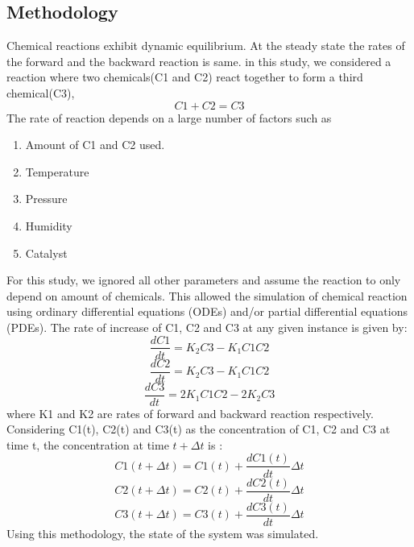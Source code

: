 \documentclass[10pt,journal,cspaper,compsoc]{IEEEtran}
\begin{document}
  \subsection{Methodology}
  Chemical reactions exhibit dynamic equilibrium. At the steady state the rates of the forward and the backward reaction is same.
  in this study, we considered a reaction where two chemicals(C1 and C2) react together to form a third chemical(C3),
  \begin{equation}
    C1 + C2 = C3
  \end{equation} 
  The rate of reaction depends on a large number of factors such as 
  \begin{enumerate}
    \item Amount of C1 and C2 used.
    \item Temperature
    \item Pressure
    \item Humidity
    \item Catalyst
  \end{enumerate}
  For this study, we ignored all other parameters and assume the reaction to only depend on amount of chemicals.
  This allowed the simulation of chemical reaction using ordinary differential equations (ODEs) and/or partial differential equations (PDEs).
  The rate of increase of C1, C2 and C3 at any given instance is given by:
  \begin{equation}
    \frac{dC1}{dt} = K_{2} C3 - K_{1} C1 C2 
  \end{equation}
\begin{equation}
  \frac{dC2}{dt} = K_{2} C3 - K_{1} C1 C2
\end{equation}
\begin{equation}
  \frac{dC3}{dt} = 2 K_{1} C1 C2 - 2 K_{2} C3
\end{equation}
where K1 and K2 are rates of forward and backward reaction respectively.\\
Considering C1(t), C2(t) and C3(t) as the concentration of C1, C2 and C3 at time t, the concentration at time 
\begin{math}
  t + \Delta t
\end{math}
is :
\begin{equation}
  C1(t+\Delta t) = C1(t) + \frac{dC1(t)}{dt} \Delta t
\end{equation} 
\begin{equation}
  C2(t+\Delta t) = C2(t) + \frac{dC2(t)}{dt} \Delta t
\end{equation}
\begin{equation}
  C3(t+\Delta t) = C3(t) + \frac{dC3(t)}{dt} \Delta t
\end{equation}
Using this methodology, the state of the system was simulated.
\cite{lab1}
\pagebreak  
\end{document}
